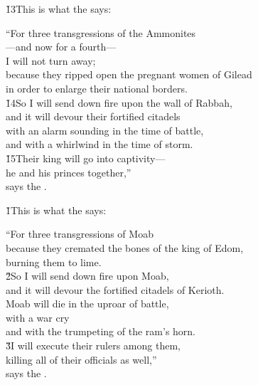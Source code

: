 \v{13}This is what the  says:

\begin{poetry}
\poeml ``For three transgressions of the Ammonites \\
\poemll    ---and now for a fourth--- \\
\poemlll       I will not turn away; \\
\poeml because they ripped open the pregnant women of Gilead \\
\poemll    in order to enlarge their national borders. \\
\poeml \v{14}So I will send down fire upon the wall of Rabbah, \\
\poemll    and it will devour their fortified citadels \\
\poemlll       with an alarm sounding in the time of battle, \\
\poemll    and with a whirlwind in the time of storm. \\
\poeml \v{15}Their king will go into captivity--- \\
\poemll    he and his princes together,'' \\
\poemlll       says the .
\end{poetry}

\v{1}This is what the  says:

\begin{poetry}
\poeml ``For three transgressions of Moab \\
\poeml because they cremated the bones of the king of Edom, \\
\poemll    burning them to lime. \\
\poeml \v{2}So I will send down fire upon Moab, \\
\poemll    and it will devour the fortified citadels of Kerioth. \\
\poeml Moab will die in the uproar of battle, \\
\poemll    with a war cry \\
\poemlll       and with the trumpeting of the ram's horn. \\
\poeml \v{3}I will execute their rulers among them, \\
\poemll    killing all of their officials as well,'' \\
\poemlll       says the .
\end{poetry}

